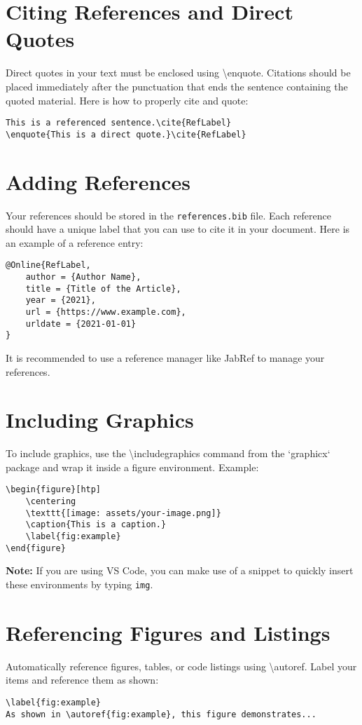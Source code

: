 \section{Citing References and Direct Quotes}
Direct quotes in your text must be enclosed using \textbackslash enquote{}. Citations should be placed immediately after the punctuation that ends the sentence containing the quoted material. Here is how to properly cite and quote:
\begin{verbatim}
This is a referenced sentence.\cite{RefLabel}
\enquote{This is a direct quote.}\cite{RefLabel}
\end{verbatim}

\section{Adding References}
Your references should be stored in the \texttt{references.bib} file. Each reference should have a unique label that you can use to cite it in your document. Here is an example of a reference entry:
\begin{verbatim}
@Online{RefLabel,
    author = {Author Name},
    title = {Title of the Article},
    year = {2021},
    url = {https://www.example.com},
    urldate = {2021-01-01}
}
\end{verbatim}

It is recommended to use a reference manager like JabRef to manage your references.

\section{Including Graphics}
To include graphics, use the \textbackslash includegraphics command from the `graphicx` package and wrap it inside a figure environment. Example:
\begin{verbatim}
\begin{figure}[htp]
    \centering
    \texttt{[image: assets/your-image.png]}
    \caption{This is a caption.}
    \label{fig:example}
\end{figure}
\end{verbatim}

\textbf{Note:} If you are using VS Code, you can make use of a snippet to quickly insert these environments by typing \texttt{img}.


\section{Referencing Figures and Listings}
Automatically reference figures, tables, or code listings using \textbackslash autoref. Label your items and reference them as shown:
\begin{verbatim}
\label{fig:example}
As shown in \autoref{fig:example}, this figure demonstrates...
\end{verbatim}

